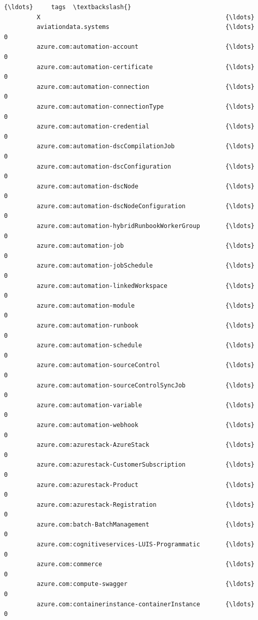 \documentclass[11pt]{article}
\begin{document}
\begin{Verbatim}[commandchars=\\\{\}]
                                                             {\ldots}     tags  \textbackslash{}
         X                                                   {\ldots}            
         aviationdata.systems                                {\ldots}        0   
         azure.com:automation-account                        {\ldots}        0   
         azure.com:automation-certificate                    {\ldots}        0   
         azure.com:automation-connection                     {\ldots}        0   
         azure.com:automation-connectionType                 {\ldots}        0   
         azure.com:automation-credential                     {\ldots}        0   
         azure.com:automation-dscCompilationJob              {\ldots}        0   
         azure.com:automation-dscConfiguration               {\ldots}        0   
         azure.com:automation-dscNode                        {\ldots}        0   
         azure.com:automation-dscNodeConfiguration           {\ldots}        0   
         azure.com:automation-hybridRunbookWorkerGroup       {\ldots}        0   
         azure.com:automation-job                            {\ldots}        0   
         azure.com:automation-jobSchedule                    {\ldots}        0   
         azure.com:automation-linkedWorkspace                {\ldots}        0   
         azure.com:automation-module                         {\ldots}        0   
         azure.com:automation-runbook                        {\ldots}        0   
         azure.com:automation-schedule                       {\ldots}        0   
         azure.com:automation-sourceControl                  {\ldots}        0   
         azure.com:automation-sourceControlSyncJob           {\ldots}        0   
         azure.com:automation-variable                       {\ldots}        0   
         azure.com:automation-webhook                        {\ldots}        0   
         azure.com:azurestack-AzureStack                     {\ldots}        0   
         azure.com:azurestack-CustomerSubscription           {\ldots}        0   
         azure.com:azurestack-Product                        {\ldots}        0   
         azure.com:azurestack-Registration                   {\ldots}        0   
         azure.com:batch-BatchManagement                     {\ldots}        0   
         azure.com:cognitiveservices-LUIS-Programmatic       {\ldots}        0   
         azure.com:commerce                                  {\ldots}        0   
         azure.com:compute-swagger                           {\ldots}        0   
         azure.com:containerinstance-containerInstance       {\ldots}        0   

\end{Verbatim}
\end{document}
